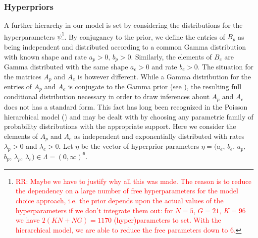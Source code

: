 \documentclass{bioinfo}
\begin{document}
\subsubsection{Hyperpriors} 
A further hierarchy in our model is set by considering the
distributions for the hyperparameters
$\psi$\footnote{\textcolor{red}{RR: Maybe we
have to justify why all this was made. The reason is to reduce the
dependency on a large number of free hyperparameters for the model
choice approach, i.e. the prior depends upon the actual
values of the hyperparameters if we don't integrate them out: for
$N=5$, $G=21$, $K=96$ we have $2(KN+NG)=1170$ (hyper)parameters to
set. With the hierarchical model, we are able to reduce the free
parameters down to 6.}}. By conjugancy to the prior, we
define the entries of $B_p$ as being independent and distributed
according to a common Gamma distribution with known shape and rate
$a_p > 0$, $b_p > 0$. Similarly, the elements of $B_e$ are Gamma
distributed with the same shape $a_e>0$ and rate $b_e>0$. The
situation for the matrices $A_p$ and $A_e$ is however different. While
a Gamma distribution for the entries of $A_p$ and
$A_e$ is conjugate to the Gamma prior (see \citealp{M}), the resulting
full conditional distribution necessary in order to draw inferences
about $A_p$ and $A_e$ does not has a standard form.  This fact has
long been recognized in the Poisson hierarchical model
(\citealp{GMS93}) and may be dealt with by choosing any parametric
family of probability distributions with the appropriate support. Here
we consider the elements of $A_p$ and $A_e$ as independent and
exponentially distributed with rates $\lambda_p > 0$ and $\lambda_e >
0$.  Let $\eta$ be the vector of hyperprior parameters $\eta = (a_e$,
$b_e$, $a_p$, $b_p$, $\lambda_p$, $\lambda_e) \in \Lambda =
(0, \infty)^6$.
\end{document}
